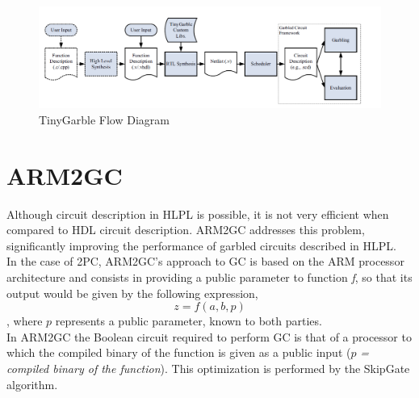\renewcommand{\figurename}{Figure}
\begin{figure}[H]
\centering
\includegraphics[width=.9\linewidth]{./figures/mpc/tinygarble_flow_diagram}
\caption{TinyGarble Flow Diagram}
\label{fig:tgdiagram}
\end{figure}

\section{ARM2GC}
Although circuit description in HLPL is possible, it is not very efficient when compared to HDL circuit description. ARM2GC addresses this problem, significantly improving the performance of garbled circuits described in HLPL.\\
In the case of 2PC, ARM2GC's approach to GC is based on the ARM processor architecture and consists in providing a public parameter to function \textit{f}, so that its output would be given by the following expression,
\begin{equation}\label{eq:arm2gc}
z = f(a,b,p)
\end{equation}
, where $p$ represents a public parameter, known to both parties.\\
In ARM2GC the Boolean circuit required to perform GC is that of a processor to which the compiled binary of the function is given as a public input ($p$\textit{ = compiled binary of the function}). This optimization is performed by the SkipGate algorithm.

 